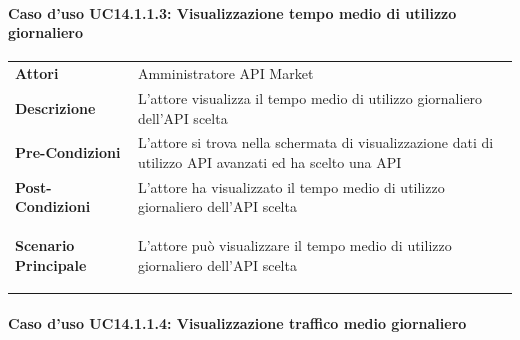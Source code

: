 \paragraph{Caso d'uso UC14.1.1.3: Visualizzazione tempo medio di utilizzo giornaliero}
\label{UC14_1_1_3}

\begin{minipage}{\linewidth}
	\begin{tabular}{ l | p{11cm}}
		\hline
		\rowcolor{Gray}
		\multicolumn{2}{c}{14.1.1.3 - Visualizzazione tempo medio di utilizzo giornaliero} \\
		\hline
		\textbf{Attori} & Amministratore API Market \\
		\textbf{Descrizione} & L'attore visualizza il tempo medio di utilizzo giornaliero dell'API scelta \\
		\textbf{Pre-Condizioni} & L'attore si trova nella schermata di visualizzazione dati di utilizzo API avanzati ed ha scelto una API \\
		\textbf{Post-Condizioni} & L'attore ha visualizzato il tempo medio di utilizzo giornaliero dell'API scelta \\
		\textbf{Scenario Principale} & 
		\begin{enumerate*}[label=(\arabic*.),itemjoin={\newline}]
			\item L'attore può visualizzare il tempo medio di utilizzo giornaliero dell'API scelta
		\end{enumerate*}\\
	\end{tabular}
\end{minipage}

\paragraph{Caso d'uso UC14.1.1.4: Visualizzazione traffico medio giornaliero}
\label{UC14_1_1_4}

